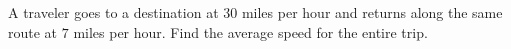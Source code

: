 A traveler goes to a destination at $30$ miles per hour and returns along the same route at $7$ miles per hour. Find the average speed for the entire trip.
